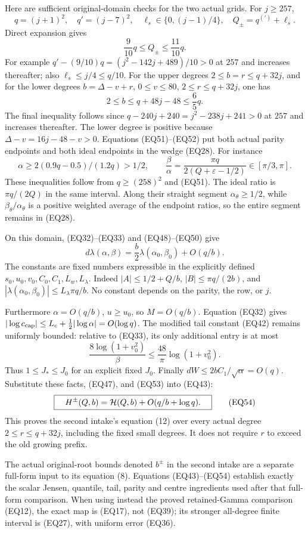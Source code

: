 Here are sufficient original-domain checks for the two actual grids.
For \(j\ge257\),
\[
 q=(j+1)^2,\quad q'=(j-7)^2,\quad
 \ell_s\in\{0,(j-1)/4\},\quad Q_\pm=q^{(\prime)}+\ell_s.
\]
Direct expansion gives
\[
 \frac9{10}q\le Q_\pm\le\frac{11}{10}q.
\tag{EQ51}
\]
For example \(q'-(9/10)q=(j^2-142j+489)/10>0\) at \(257\)
and increases thereafter; also \(\ell_s\le j/4\le q/10\).
For the upper degrees \(2\le b=r\le q+32j\), and for the lower
degrees \(b=\Delta-v+r\), \(0\le v\le80\), \(2\le r\le q+32j\),
one has
\[
 2\le b\le q+48j-48\le\frac65q.
\tag{EQ52}
\]
The final inequality follows since
\(q-240j+240=j^2-238j+241>0\) at \(257\) and increases thereafter.
The lower degree is positive because \(\Delta-v=16j-48-v>0\).
Equations (EQ51)--(EQ52) put both actual parity endpoints and both ideal
endpoints in the wedge (EQ28).  For instance
\[
 \alpha\ge 2(0.9q-0.5)/(1.2q)>1/2,\qquad
 \frac{\beta}{\alpha}
     =\frac{\pi q}{2(Q+\varepsilon-1/2)}\in[\pi/3,\pi].
\]
These inequalities follow from \(q\ge(258)^2\) and (EQ51).
The ideal ratio is \(\pi q/(2Q)\) in the same interval.
Along their straight segment \(\alpha_\theta\ge1/2\), while
\(\beta_\theta/\alpha_\theta\) is a positive weighted average of
the endpoint ratios, so the entire segment remains in (EQ28).

On this domain, (EQ32)--(EQ33) and (EQ48)--(EQ50) give
\[
 d\lambda(\alpha,\beta)
      =\frac b2\lambda(\alpha_0,\beta_0)+O(q/b).
\tag{EQ53}
\]
The constants are fixed numbers expressible in the explicitly defined
\(s_0,u_0,v_0,C_0,C_1,L_w,L_\lambda\).
Indeed \(|A|\le1/2+Q/b\), \(|B|\le\pi q/(2b)\),
and \(|\lambda(\alpha_0,\beta_0)|\le L_\lambda\pi q/b\).
No constant depends on the parity, the row, or \(j\).

Furthermore \(\alpha=O(q/b)\), \(u\ge u_0\), so \(M=O(q/b)\).
Equation (EQ32) gives
\(|\log c_{\rm cap}|\le L_c+\tfrac12|\log\alpha|=O(\log q)\).
The modified tail constant (EQ42) remains uniformly bounded: relative
to (EQ33), its only additional entry is at most
\[
 \frac{8\log(1+v_0^2)}{\beta}
 \le \frac{48}{\pi}\log(1+v_0^2).
\]
Thus \(1\le J_*\le J_0\) for an explicit fixed \(J_0\).
Finally \(dW\le 2bC_1/\sqrt\alpha=O(q)\).
Substitute these facts, (EQ47), and (EQ53) into (EQ43):
\[
 \boxed{\quad H^\pm(Q,b)
      ={\cal H}(Q,b)+O(q/b+\log q).\quad}
\tag{EQ54}
\]
This proves the second intake's equation (12) over every actual
degree \(2\le r\le q+32j\), including the fixed small degrees.
It does not require \(r\) to exceed the old growing prefix.

The actual original-root bounds denoted \(b^\pm\) in the second intake
are a separate full-form input to its equation (8).  Equations
(EQ43)--(EQ54) establish exactly the scalar Jensen, quantile, tail,
parity and centre ingredients used after that full-form comparison.
When using instead the proved retained-Gamma comparison (EQ12), the
exact map is (EQ17), not (EQ39); its stronger all-degree finite interval
is (EQ27), with uniform error (EQ36).


